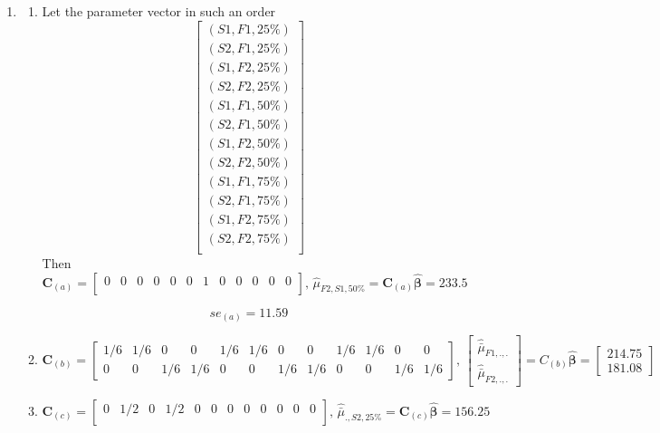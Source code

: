 \documentclass{article}
\begin{document}
\begin{enumerate}[leftmargin = 0 em, label = \arabic*., font = \bfseries]
	\item 
	\begin{enumerate}
		\item 
		Let the parameter vector in such an order
		\[\begin{bmatrix}
			(S1, F1, 25\%)\\
			(S2, F1, 25\%)\\
			(S1, F2, 25\%)\\
			(S2, F2, 25\%)\\
			(S1, F1, 50\%)\\
			(S2, F1, 50\%)\\
			(S1, F2, 50\%)\\
			(S2, F2, 50\%)\\
			(S1, F1, 75\%)\\
			(S2, F1, 75\%)\\
			(S1, F2, 75\%)\\
			(S2, F2, 75\%)\\
		\end{bmatrix}\]
		Then
		\[\bm C_{(a)} = \begin{bmatrix}
			0&0&0&0&0&0&1&0&0&0&0&0\\

		\end{bmatrix},\, \hat{\mu}_{F2,S1,50\%} = \bm C_{(a)} \hat{\bm \beta} = 233.5\]

		\[se_{(a)} = 11.59\]

		

		\item 
		
		\[\bm C_{(b)} = \begin{bmatrix}
			1/6&1/6&0&0&1/6&1/6&0&0&1/6&1/6&0&0\\
			0&0&1/6&1/6&0&0&1/6&1/6&0&0&1/6&1/6
		\end{bmatrix},\, \begin{bmatrix}
			\hat{\bar{\mu}}_{F1,.,.}\\
			\hat{\bar{\mu}}_{F2,.,.}
		\end{bmatrix} = C_{(b)} \hat{\bm \beta} =\begin{bmatrix}
			214.75\\
			181.08
		\end{bmatrix}\]

		\item 
		\[\bm C_{(c)} = \begin{bmatrix}
			0&1/2&0&1/2&0&0&0&0&0&0&0&0\\

		\end{bmatrix},\, \hat{\bar{\mu}}_{.,S2,25\%} = \bm C_{(c)} \hat{\bm \beta} = 156.25\]


\end{enumerate}
\end{enumerate}
\end{document}
